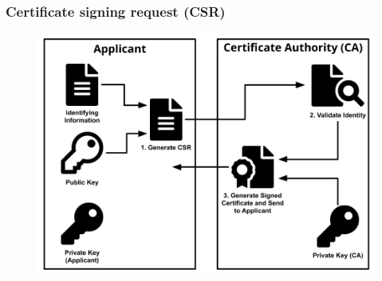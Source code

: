\documentclass[11pt]{article}
\begin{document}
\subsubsection{Certificate signing request (CSR)}

\begin{figure}[!ht]
 \includegraphics[width=.98\textwidth]{pic5-hw6-7-1635747}
 \label{fig:CA sign certificate}
\end{figure}
\end{document}
